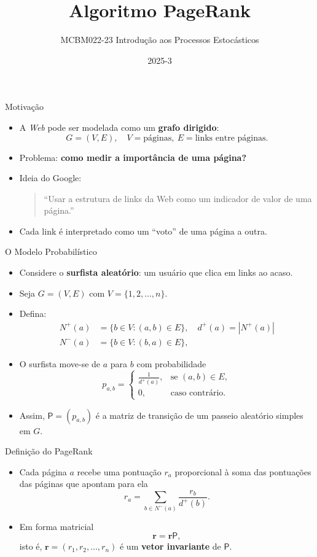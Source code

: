 \documentclass[aspectratio=169]{beamer}
\title{Algoritmo PageRank}
\author[MCBM022-23]{MCBM022-23 Introdução aos Processos Estocásticos }
\institute{UFABC}
\date{2025-3}
\begin{document}
\frame{\titlepage}

\begin{frame}{Motivação}
\begin{itemize}\itemsep=.75cm
  \item A \emph{Web} pode ser modelada como um \textbf{grafo dirigido}:
  \[
     G = (V,E), \quad V = \text{páginas}, \ E = \text{links entre páginas}.
  \]
  \item Problema: \textbf{como medir a importância de uma página?}
  \item Ideia do Google:
  \begin{quote}
  “Usar a estrutura de links da Web como um indicador de valor de uma página.”
  \end{quote}
  \item Cada link é interpretado como um “voto” de uma página a outra.
\end{itemize}
\end{frame}

\begin{frame}{O Modelo Probabilístico}
\begin{itemize}\itemsep=.5cm
  \item Considere o \textbf{surfista aleatório}: um usuário que clica em links ao acaso.
  \item Seja $G=(V,E)$ com $V=\{1,2,\dots,n\}$.
  \item Defina:
  \[
    \begin{aligned}
      N^+(a) &= \{b\in V : (a,b)\in E\}, \quad d^+(a)=|N^+(a)|\\
      N^-(a) &= \{b\in V : (b,a)\in E\}, %
    \end{aligned}    
  \]
  \item O surfista move-se de $a$ para $b$ com probabilidade
  \[
    p_{a,b} =
    \begin{cases}
      \frac{1}{d^+(a)}, & \text{se }(a,b)\in E,\\
      0, & \text{caso contrário.}
    \end{cases}
  \]
\item Assim, $\mathsf{P}=(p_{a,b})$ é a matriz de transição de um
  passeio aleatório simples em $G$.
\end{itemize}
\end{frame}

\begin{frame}{Definição do PageRank}
\begin{itemize}
\item Cada página $a$ recebe uma pontuação $r_a$ proporcional à soma
  das pontuações das páginas que apontam para ela
  \[
  r_a = \sum_{b\in N^-(a)} \frac{r_b}{d^+(b)}.
  \]
  \item Em forma matricial \pause
  \[
     \bm{r} = \bm{r}\mathsf{P},
  \]
  isto é, $\bm{r} = (r_1,r_2,\dots,r_n)$ é um \textbf{vetor invariante}
  de $\mathsf{P}$.
\end{itemize}
\end{frame}
\end{document}
